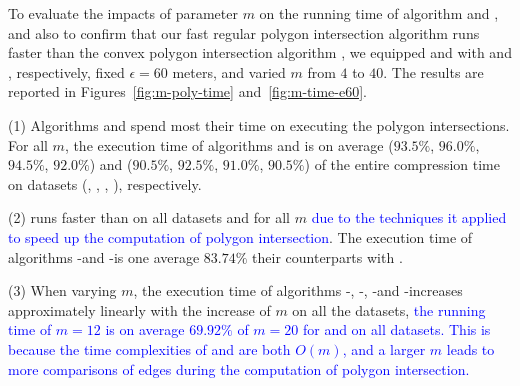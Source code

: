 {%
To evaluate the impacts of parameter $m$ on the running time of algorithm \cist and \cista,
 and also to confirm that our fast regular polygon intersection algorithm \rpia runs faster than the convex polygon intersection algorithm \cpia,
we equipped \cist and \cista with \rpia and \cpia, respectively, fixed $\epsilon =60$ meters, and varied $m$ from $4$ to $40$.
%
The results are reported in Figures~\ref{fig:m-poly-time} and~\ref{fig:m-time-e60}.

\ni(1) Algorithms \cist and \cista spend most their time on executing the
polygon intersections. For all $m$, the execution time of algorithms \cpia and
\rpia is on average {($93.5\%$, $96.0\%$, $94.5\%$, $92.0\%$)
	and ($90.5\%$, $92.5\%$, $91.0\%$, $90.5\%$)} of the entire compression  time on {datasets}
(\sercar, \geolife, \mopsi, \pricar), respectively.

\ni(2) \rpia runs faster than \cpia on all datasets and for all $m$ \textcolor{blue}{due to the techniques it applied to speed up
the computation of polygon intersection}. The execution time of algorithms \cist-\rpia and \cista-\rpia is one average $83.74\%$ their counterparts with \cpia.

\ni(3) When varying $m$, the execution time of algorithms \cist-\rpia, \cist-\cpia, \cista-\rpia and \cista-\cpia increases approximately linearly with the increase of $m$ on all the datasets, \textcolor{blue}{\eg the running time of $m=12$ is on average $69.92\%$ of $m=20$ for \cist and \cista on all datasets. This is because the time complexities of \rpia and \cpia are both $O(m)$, and a larger $m$ leads to more comparisons of edges during the computation of  polygon intersection.}





}
